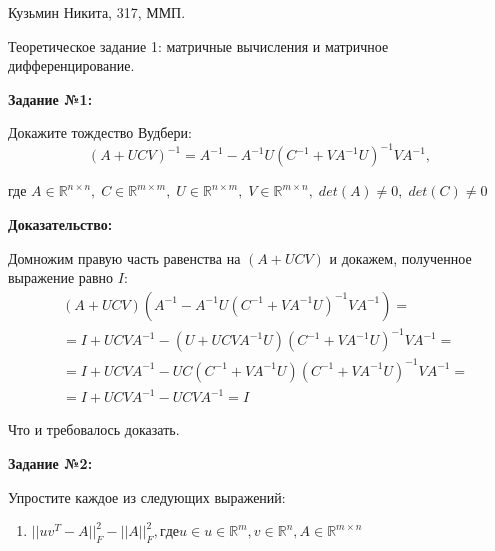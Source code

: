 \documentclass[a4paper, 11pt]{article}
\begin{document}
    \hfill Кузьмин Никита, 317, ММП.
    \begin{center}
        \large Теоретическое задание 1: матричные вычисления и матричное дифференцирование.
    \end{center}

    \noindent \large\textbf{Задание №1:} \normalsize
    
    Докажите тождество Вудбери:
    \[(A + UCV)^{-1} = A^{-1} - A^{-1}U(C^{-1} + VA^{-1}U)^{-1}VA^{-1},\]
    
    где $A \in \mathbb{R}^{n \times n}, \; C \in \mathbb{R}^{m \times m}, \; U \in \mathbb{R}^{n \times m}, \; V \in \mathbb{R}^{m \times n}, \; det(A) \ne 0, \; det(C) \ne 0$
    
    \textbf{Доказательство:}
    
    \quad Домножим правую часть равенства на $(A + UCV)$ и докажем, полученное выражение равно  $I$:
    \begin{equation}
        \begin{aligned}
            & (A + UCV)(A^{-1} - A^{-1}U(C^{-1} + VA^{-1}U)^{-1}VA^{-1}) = \\
            & = I + UCVA^{-1} - (U + UCVA^{-1}U)(C^{-1} + VA^{-1}U)^{-1}VA^{-1} = \\ 
            & = I + UCVA^{-1} - UC(C^{-1} + VA^{-1}U)(C^{-1} + VA^{-1}U)^{-1}VA^{-1} = \\
            & = I + UCVA^{-1} - UCVA^{-1} = I
        \end{aligned}
    \end{equation}
    
    \quad Что и требовалось доказать.
    \vspace{5ex}
    
    \noindent \large\textbf{Задание №2:} \normalsize
    
    
    Упростите каждое из следующих выражений:
    \begin{enumerate}
        \item $||uv^{T} - A||_{F}^2 - ||A||_{F}^2, где u \in u \in \mathbb{R}^m, v \in \mathbb{R}^n, A \in \mathbb{R}^{m \times n}$
    \end{enumerate}
    
    
    
    
    
\end{document}
